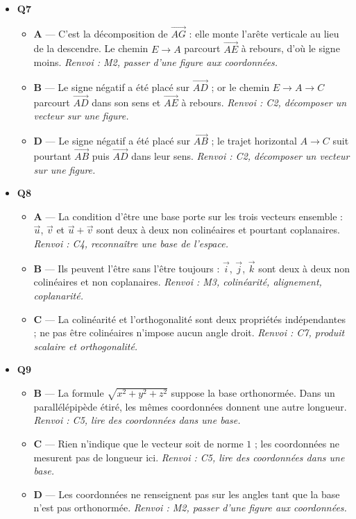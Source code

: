 \begin{itemize}
\begin{itemize}
  \end{itemize}
  \item \textbf{Q7}
  \begin{itemize}
    \item \textbf{A} — C'est la décomposition de $\vec{AG}$ : elle monte l'arête verticale au lieu de la descendre. Le chemin $E\to A$ parcourt $\vec{AE}$ à rebours, d'où le signe moins. \emph{Renvoi : M2, passer d'une figure aux coordonnées.}
    \item \textbf{B} — Le signe négatif a été placé sur $\vec{AD}$ ; or le chemin $E\to A\to C$ parcourt $\vec{AD}$ dans son sens et $\vec{AE}$ à rebours. \emph{Renvoi : C2, décomposer un vecteur sur une figure.}
    \item \textbf{D} — Le signe négatif a été placé sur $\vec{AB}$ ; le trajet horizontal $A\to C$ suit pourtant $\vec{AB}$ puis $\vec{AD}$ dans leur sens. \emph{Renvoi : C2, décomposer un vecteur sur une figure.}
  \end{itemize}
  \item \textbf{Q8}
  \begin{itemize}
    \item \textbf{A} — La condition d'être une base porte sur les trois vecteurs ensemble : $\vec{u}$, $\vec{v}$ et $\vec{u}+\vec{v}$ sont deux à deux non colinéaires et pourtant coplanaires. \emph{Renvoi : C4, reconnaître une base de l'espace.}
    \item \textbf{B} — Ils peuvent l'être sans l'être toujours : $\vec{i}$, $\vec{j}$, $\vec{k}$ sont deux à deux non colinéaires et non coplanaires. \emph{Renvoi : M3, colinéarité, alignement, coplanarité.}
    \item \textbf{C} — La colinéarité et l'orthogonalité sont deux propriétés indépendantes ; ne pas être colinéaires n'impose aucun angle droit. \emph{Renvoi : C7, produit scalaire et orthogonalité.}
  \end{itemize}
  \item \textbf{Q9}
  \begin{itemize}
    \item \textbf{B} — La formule $\sqrt{x^2+y^2+z^2}$ suppose la base orthonormée. Dans un parallélépipède étiré, les mêmes coordonnées donnent une autre longueur. \emph{Renvoi : C5, lire des coordonnées dans une base.}
    \item \textbf{C} — Rien n'indique que le vecteur soit de norme $1$ ; les coordonnées ne mesurent pas de longueur ici. \emph{Renvoi : C5, lire des coordonnées dans une base.}
    \item \textbf{D} — Les coordonnées ne renseignent pas sur les angles tant que la base n'est pas orthonormée. \emph{Renvoi : M2, passer d'une figure aux coordonnées.}

\end{itemize}
\end{itemize}
